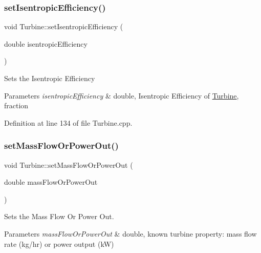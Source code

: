 \subsubsection{\texorpdfstring{set\+Isentropic\+Efficiency()}{setIsentropicEfficiency()}\hspace{0.1cm}{\footnotesize\ttfamily [3/3]}}
{\footnotesize\ttfamily void Turbine\+::set\+Isentropic\+Efficiency (\begin{DoxyParamCaption}\item[{double}]{isentropic\+Efficiency }\end{DoxyParamCaption})}

Sets the Isentropic Efficiency


\begin{DoxyParams}{Parameters}
{\em isentropic\+Efficiency} & double, Isentropic Efficiency of \hyperlink{class_turbine}{Turbine}, fraction \\
\hline
\end{DoxyParams}


Definition at line 134 of file Turbine.\+cpp.

\mbox{\label{class_turbine_a73522631e2eeefa8ea14d5b537e3e760}} 
\subsubsection{\texorpdfstring{set\+Mass\+Flow\+Or\+Power\+Out()}{setMassFlowOrPowerOut()}\hspace{0.1cm}{\footnotesize\ttfamily [1/3]}}
{\footnotesize\ttfamily void Turbine\+::set\+Mass\+Flow\+Or\+Power\+Out (\begin{DoxyParamCaption}\item[{double}]{mass\+Flow\+Or\+Power\+Out }\end{DoxyParamCaption})}



Sets the Mass Flow Or Power Out. 


\begin{DoxyParams}{Parameters}
{\em mass\+Flow\+Or\+Power\+Out} & double, known turbine property\+: mass flow rate (kg/hr) or power output (kW) \\
\hline
\end{DoxyParams}
\mbox{\label{class_turbine_a73522631e2eeefa8ea14d5b537e3e760}} 
